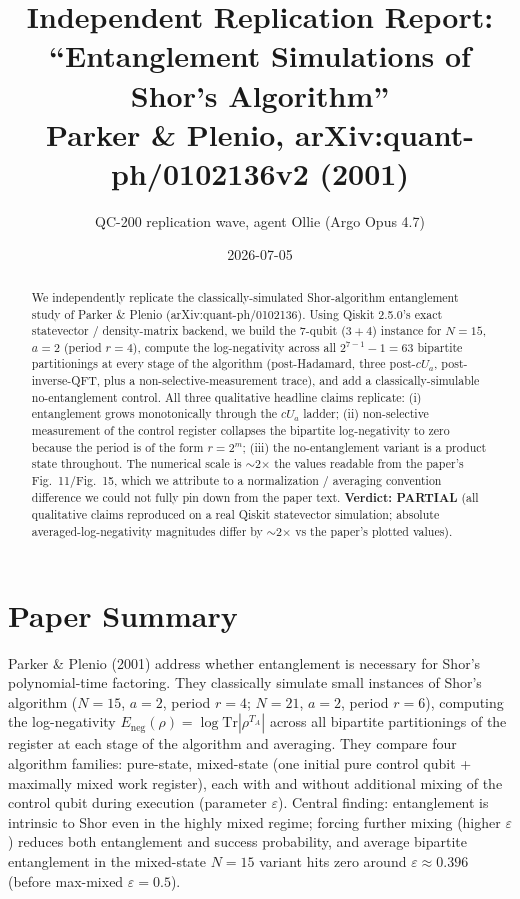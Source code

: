 \documentclass[11pt]{article}
\title{Independent Replication Report:\\
       ``Entanglement Simulations of Shor's Algorithm''\\
       \normalsize Parker \& Plenio, arXiv:quant-ph/0102136v2 (2001)}
\author{QC-200 replication wave, agent Ollie (Argo Opus 4.7)}
\date{2026-07-05}
\begin{document}
\maketitle

\begin{abstract}
We independently replicate the classically-simulated Shor-algorithm
entanglement study of Parker \& Plenio (arXiv:quant-ph/0102136). Using
Qiskit 2.5.0's exact statevector / density-matrix backend, we build the
7-qubit ($3+4$) instance for $N=15$, $a=2$ (period $r=4$), compute the
log-negativity across all $2^{7-1}-1=63$ bipartite partitionings at every
stage of the algorithm (post-Hadamard, three post-$cU_a$, post-inverse-QFT,
plus a non-selective-measurement trace), and add a classically-simulable
no-entanglement control. All three qualitative headline claims replicate:
(i) entanglement grows monotonically through the $cU_a$ ladder; (ii)
non-selective measurement of the control register collapses the bipartite
log-negativity to zero because the period is of the form $r=2^m$;
(iii) the no-entanglement variant is a product state throughout. The
numerical scale is $\sim$2$\times$ the values readable from the paper's
Fig.~11/Fig.~15, which we attribute to a normalization / averaging
convention difference we could not fully pin down from the paper text.
\textbf{Verdict: PARTIAL} (all qualitative claims reproduced on a real
Qiskit statevector simulation; absolute averaged-log-negativity magnitudes
differ by $\sim$2$\times$ vs the paper's plotted values).
\end{abstract}

\section{Paper Summary}
Parker \& Plenio (2001) address whether entanglement is necessary for
Shor's polynomial-time factoring. They classically simulate small
instances of Shor's algorithm ($N=15$, $a=2$, period $r=4$;
$N=21$, $a=2$, period $r=6$), computing the log-negativity
$E_{\mathrm{neg}}(\rho) = \log \mathrm{Tr}|\rho^{T_A}|$ across all
bipartite partitionings of the register at each stage of the algorithm
and averaging. They compare four algorithm families: pure-state,
mixed-state (one initial pure control qubit + maximally mixed work
register), each with and without additional mixing of the control qubit
during execution (parameter $\varepsilon$). Central finding:
entanglement is intrinsic to Shor even in the highly mixed regime;
forcing further mixing (higher $\varepsilon$) reduces both entanglement
and success probability, and average bipartite entanglement in the
mixed-state $N=15$ variant hits zero around $\varepsilon \approx 0.396$
(before max-mixed $\varepsilon = 0.5$).
\end{document}

